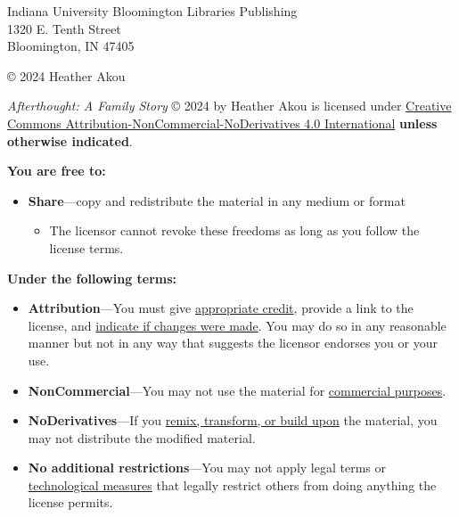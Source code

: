 \begin{flushleft}
\thispagestyle{empty}
\begin{small}
Indiana University Bloomington Libraries Publishing\\
1320 E. Tenth Street\\
Bloomington, IN 47405
\vspace{5mm}

© 2024 Heather Akou

\vspace{4mm}
\ccbyncnd

\textit{Afterthought: A Family Story} © 2024 by Heather Akou is licensed under \href{https://creativecommons.org/licenses/by-nc-nd/4.0/?ref=chooser-v1}{Creative Commons Attribution-NonCommercial-NoDerivatives 4.0 International} \textbf{unless otherwise indicated}.  

\vspace{3mm}

\textbf{You are free to:}
\begin{itemize}
\tightlist
\item \textbf{Share}---copy and redistribute the material in any medium or format
  \begin{itemize}
    \item The licensor cannot revoke these freedoms as long as you follow the license terms.
  \end{itemize}
\end{itemize}

\vspace{3mm}

\textbf{Under the following terms:}
\begin{itemize}
\tightlist
\item \textbf{Attribution}---You must give \href{https://creativecommons.org/licenses/by-nc-nd/4.0/?ref=chooser-v1#ref-appropriate-credit}{appropriate credit}, provide a link to the license, and \href{https://creativecommons.org/licenses/by-nc-nd/4.0/?ref=chooser-v1#ref-indicate-changes}{indicate if changes were made}. You may do so in any reasonable manner but not in any way that suggests the licensor endorses you or your use.\\
\item \textbf{NonCommercial}---You may not use the material for \href{https://creativecommons.org/licenses/by-nc-nd/4.0/?ref=chooser-v1#ref-commercial-purposes}{commercial purposes}.
\item \textbf{NoDerivatives}---If you \href{https://creativecommons.org/licenses/by-nc-nd/4.0/?ref=chooser-v1#ref-some-kinds-of-mods}{remix, transform, or build upon} the material, you may not distribute the modified material.
\item \textbf{No additional restrictions}---You may not apply legal terms or \href{https://creativecommons.org/licenses/by-nc-nd/4.0/?ref=chooser-v1#ref-technological-measures}{technological measures} that legally restrict others from doing anything the license permits.
\end{itemize}


\end{small}
\end{flushleft}

